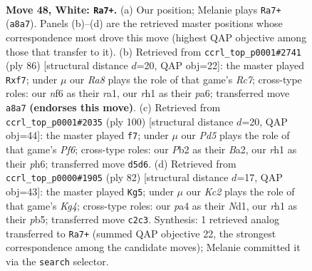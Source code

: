\documentclass[11pt]{article}
\begin{document}
\clearpage

\begin{figure}[p]\centering
\begin{subfigure}{0.46\textwidth}\centering
\resizebox{\linewidth}{!}{%
\newchessgame
\chessboard[
  setfen={R7/4k3/5n2/1P1P4/p1p3P1/8/1PK5/7r w - - 7 48},
  showmover=false,
  pgfstyle=straightmove, color=movearrow, markmove={a8-a7}
]}
\caption{}
\end{subfigure}\hfill
\begin{subfigure}{0.46\textwidth}\centering
\resizebox{\linewidth}{!}{%
\newchessgame
\chessboard[
  setfen={8/2R2pp1/p7/4k1P1/P7/8/4PK2/r7 w - - 2 44},
  showmover=false,
  pgfstyle=straightmove, color=movearrow, markmove={c7-f7}
]}
\caption{}
\end{subfigure}
\\[4pt]
\begin{subfigure}{0.46\textwidth}\centering
\resizebox{\linewidth}{!}{%
\newchessgame
\chessboard[
  setfen={5r1k/p6n/5P1p/1p2R3/7P/6K1/BP6/8 w - - 1 51},
  showmover=false,
  pgfstyle=straightmove, color=movearrow, markmove={f6-f7}
]}
\caption{}
\end{subfigure}\hfill
\begin{subfigure}{0.46\textwidth}\centering
\resizebox{\linewidth}{!}{%
\newchessgame
\chessboard[
  setfen={2k5/2p5/6p1/1pn5/4PPK1/1P6/8/3N4 w - - 3 42},
  showmover=false,
  pgfstyle=straightmove, color=movearrow, markmove={g4-g5}
]}
\caption{}
\end{subfigure}
\caption{\textbf{Move 48, White: \texttt{Ra7+}.} (a) Our position; Melanie plays \texttt{Ra7+} (\texttt{a8a7}). Panels (b)--(d) are the retrieved master positions whose correspondence most drove this move (highest QAP objective among those that transfer to it). (b) Retrieved from \texttt{ccrl\_top\_p0001\#2741} (ply 86) [structural distance $d$=20, QAP obj=22]: the master played \texttt{Rxf7}; under $\mu$ our \emph{Ra8} plays the role of that game's \emph{Rc7}; cross-type roles: our \emph{n}f6 as their \emph{r}a1, our \emph{r}h1 as their \emph{p}a6; transferred move \texttt{a8a7} \textbf{(endorses this move)}. (c) Retrieved from \texttt{ccrl\_top\_p0001\#2035} (ply 100) [structural distance $d$=20, QAP obj=44]: the master played \texttt{f7}; under $\mu$ our \emph{Pd5} plays the role of that game's \emph{Pf6}; cross-type roles: our \emph{P}b2 as their \emph{B}a2, our \emph{r}h1 as their \emph{p}h6; transferred move \texttt{d5d6}. (d) Retrieved from \texttt{ccrl\_top\_p0000\#1905} (ply 82) [structural distance $d$=17, QAP obj=43]: the master played \texttt{Kg5}; under $\mu$ our \emph{Kc2} plays the role of that game's \emph{Kg4}; cross-type roles: our \emph{p}a4 as their \emph{N}d1, our \emph{r}h1 as their \emph{p}b5; transferred move \texttt{c2c3}. Synthesis: 1 retrieved analog transferred to \texttt{Ra7+} (summed QAP objective 22, the strongest correspondence among the candidate moves); Melanie committed it via the \texttt{search} selector.}
\label{fig:thought-m94}
\end{figure}
\end{document}
